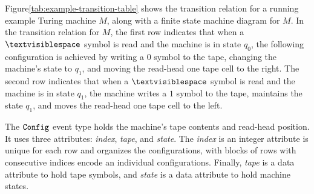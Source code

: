 \begin{examp}\label{ex:tm-rules}
Figure\:\ref{tab:example-transition-table} shows the transition relation
for a running example Turing machine $M$,
along with a finite state machine diagram for $M$.
In the transition relation for $M$,
the first row indicates that
when a $\blank$ symbol is read and the machine is in state $q_0$,
the following configuration is achieved by
writing a $0$ symbol to the tape,
changing the machine's state to $q_1$,
and moving the read-head one tape cell to the right.
The second row indicates that
when a $\blank$ symbol is read and the machine is in state $q_1$,
the machine writes a $1$ symbol to the tape,
maintains the state $q_1$,
and moves the read-head one tape cell to the left.
\end{examp}

The $\texttt{Config}$ event type
holds the machine's tape contents and read-head position.
It uses three attributes:
{\em index}, {\em tape}, and {\em state}.
The {\em index} is an integer attribute is unique for each row
and organizes the configurations,
with blocks of rows with consecutive indices
encode an individual configurations.
Finally, {\em tape} is a data attribute to hold tape symbols,
and {\em state} is a data attribute to hold machine states.

